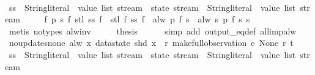 \begin{isabellebody}
%
\isatagproof
{}\isamarkupfalse%
\ {\isacharminus}\isanewline
\ \ \isamarkupfalse%
\ ss\ {\isacharcolon}{\isacharcolon}\ {\isachardoublequoteopen}{\isacharparenleft}{\isacharparenleft}String{\isachardot}literal\ {\isasymtimes}\ value\ list{\isacharparenright}\ stream\ {\isasymRightarrow}\ state\ stream{\isacharparenright}\ {\isasymRightarrow}\ {\isacharparenleft}String{\isachardot}literal\ {\isasymtimes}\ value\ list{\isacharparenright}\ stream{\isachardoublequoteclose}\ \isanewline
\ \ \ \ {\isachardoublequoteopen}{\isasymforall}f\ p\ s{\isachardot}\ f\ {\isacharparenleft}stl\ {\isacharparenleft}ss\ f{\isacharparenright}{\isacharparenright}\ {\isasymnoteq}\ stl\ {\isacharparenleft}f\ {\isacharparenleft}ss\ f{\isacharparenright}{\isacharparenright}\ {\isasymor}\ alw\ p\ {\isacharparenleft}f\ s{\isacharparenright}\ {\isacharequal}\ alw\ {\isacharparenleft}{\isasymlambda}s{\isachardot}\ p\ {\isacharparenleft}f\ s{\isacharparenright}{\isacharparenright}\ s{\isachardoublequoteclose}\isanewline
\ \ \ \ \isamarkupfalse%
\ {\isacharparenleft}metis\ {\isacharparenleft}no{\isacharunderscore}types{\isacharparenright}\ alw{\isacharunderscore}inv{\isacharparenright}\isanewline
\ \ \isamarkupfalse%
\ \isamarkupfalse%
\ {\isacharquery}thesis\isanewline
\ \ \ \ \isamarkupfalse%
\ {\isacharparenleft}simp\ add{\isacharcolon}\ output_eq{\isacharunderscore}def\ all{\isacharunderscore}imp{\isacharunderscore}alw{\isacharparenright}\isanewline
{}\isamarkupfalse%
%
\endisatagproof
{\isafoldproof}%
%
\isadelimproof
\isanewline
%
\endisadelimproof
\isanewline
{}\isamarkupfalse%
\ no{\isacharunderscore}updates{\isacharunderscore}none{\isacharcolon}\ {\isachardoublequoteopen}alw\ {\isacharparenleft}{\isasymlambda}x{\isachardot}\ datastate\ {\isacharparenleft}shd\ x{\isacharparenright}\ {\isacharequal}\ r{\isacharparenright}\ {\isacharparenleft}make{\isacharunderscore}full{\isacharunderscore}observation\ e\ None\ r\ t{\isacharparenright}{\isachardoublequoteclose}\isanewline
%
\isadelimproof
%
\endisadelimproof
%
\isatagproof
{}\isamarkupfalse%
\ {\isacharminus}\isanewline
\ \ \isamarkupfalse%
\ ss\ {\isacharcolon}{\isacharcolon}\ {\isachardoublequoteopen}{\isacharparenleft}{\isacharparenleft}String{\isachardot}literal\ {\isasymtimes}\ value\ list{\isacharparenright}\ stream\ {\isasymRightarrow}\ state\ stream{\isacharparenright}\ {\isasymRightarrow}\ {\isacharparenleft}String{\isachardot}literal\ {\isasymtimes}\ value\ list{\isacharparenright}\ stream{\isachardoublequoteclose}\ \isanewline

\end{isabellebody}
